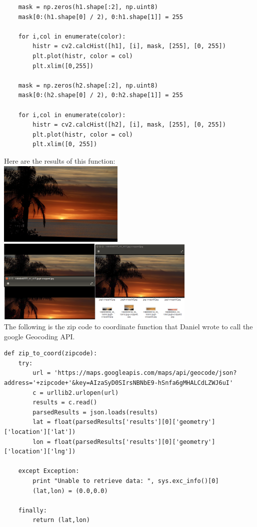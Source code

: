 \documentclass[onecolumn, draftclsnofoot,10pt, compsoc]{IEEEtran}
\begin{document}
\begin{singlespace}
\begin{lstlisting}
	mask = np.zeros(h1.shape[:2], np.uint8)
	mask[0:(h1.shape[0] / 2), 0:h1.shape[1]] = 255

	for i,col in enumerate(color):
		histr = cv2.calcHist([h1], [i], mask, [255], [0, 255])
		plt.plot(histr, color = col)
		plt.xlim([0,255])

	mask = np.zeros(h2.shape[:2], np.uint8)
	mask[0:(h2.shape[0] / 2), 0:h2.shape[1]] = 255

	for i,col in enumerate(color):
		histr = cv2.calcHist([h2], [i], mask, [255], [0, 255])
		plt.plot(histr, color = col)
		plt.xlim([0, 255])
			\end{lstlisting}	
			Here are the results of this function:\\
			\includegraphics[height=4cm,natwidth=640,natheight=426]{images/horizon_uncropped.jpg}\\
			\includegraphics[height=4cm,natwidth=1281,natheight=537]{images/horizon_cropped.png}\\
			The following is the zip code to coordinate function that Daniel wrote to call the google Geocoding API.
			\begin{lstlisting}
def zip_to_coord(zipcode):
    try:
        url = 'https://maps.googleapis.com/maps/api/geocode/json?address='+zipcode+'&key=AIzaSyD0SIrsNBNbE9-hSnfa6gMHALCdLZWJ6uI'
        c = urllib2.urlopen(url)
        results = c.read()
        parsedResults = json.loads(results)
        lat = float(parsedResults['results'][0]['geometry']['location']['lat'])
        lon = float(parsedResults['results'][0]['geometry']['location']['lng'])

    except Exception:
        print "Unable to retrieve data: ", sys.exc_info()[0]
        (lat,lon) = (0.0,0.0)

    finally:
        return (lat,lon)
			\end{lstlisting}
\end{singlespace}
\clearpage


\end{document}
